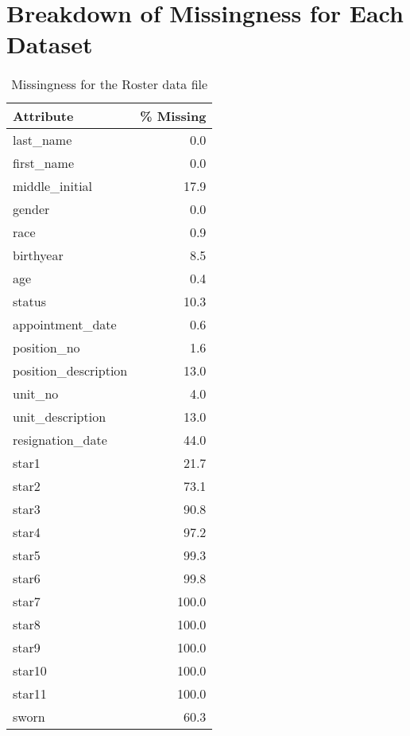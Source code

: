 \section{Breakdown of Missingness for Each Dataset}\label{sec:missingness}

\begin{table}
	\begin{minipage}[t]{0.48\textwidth}
\centering
\caption{Missingness for the Roster data file}
\begin{tabular}{lr}
\toprule
           Attribute &  \% Missing \\
\midrule
           last\_name &        0.0 \\
          first\_name &        0.0 \\
      middle\_initial &       17.9 \\
              gender &        0.0 \\
                race &        0.9 \\
           birthyear &        8.5 \\
                 age &        0.4 \\
              status &       10.3 \\
    appointment\_date &        0.6 \\
         position\_no &        1.6 \\
position\_description &       13.0 \\
             unit\_no &        4.0 \\
    unit\_description &       13.0 \\
    resignation\_date &       44.0 \\
               star1 &       21.7 \\
               star2 &       73.1 \\
               star3 &       90.8 \\
               star4 &       97.2 \\
               star5 &       99.3 \\
               star6 &       99.8 \\
               star7 &      100.0 \\
               star8 &      100.0 \\
               star9 &      100.0 \\
              star10 &      100.0 \\
              star11 &      100.0 \\
               sworn &       60.3 \\

\end{tabular}
\end{minipage}
\end{table}
